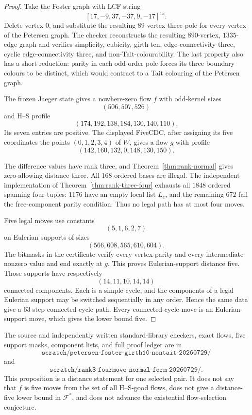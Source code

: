 \documentclass[11pt]{article}
\theoremstyle{definition}
\theoremstyle{remark}
\numberwithin{equation}{section}
\begin{document}
\begin{proof}
Take the Foster graph with LCF string
\[
                 [17,-9,37,-37,9,-17]^{15}.
\]
Delete vertex \(0\), and substitute the resulting \(89\)-vertex
three-pole for every vertex of the Petersen graph.  The checker
reconstructs the resulting \(890\)-vertex, \(1335\)-edge graph and
verifies simplicity, cubicity, girth ten, edge-connectivity three,
cyclic edge-connectivity three, and non-Tait-colourability.  The last
property also has a short reduction: parity in each odd-order pole
forces its three boundary colours to be distinct, which would contract
to a Tait colouring of the Petersen graph.

The frozen Jaeger state gives a nowhere-zero flow \(f\) with odd-kernel
sizes
\[
                         (506,507,526)
\]
and H--S profile
\[
                 (174,192,138,184,130,140,110).
\]
Its seven entries are positive.  The displayed FiveCDC, after assigning
its five coordinates the points \((0,1,2,3,4)\) of \(W\), gives a flow
\(g\) with profile
\[
                 (142,160,132,0,148,130,150).
\]

The difference values have rank three, and
Theorem~\ref{thm:rank-normal} gives zero-allowing distance three.
All \(168\) ordered bases are illegal.  The independent implementation
of Theorem~\ref{thm:rank-three-four} exhausts all \(1848\) ordered
spanning four-tuples: \(1176\) have an empty local list \(L_e\), and
the remaining \(672\) fail the free-component parity condition.
Thus no legal path has at most four moves.

Five legal moves use constants
\[
                         (5,1,6,2,7)
\]
on Eulerian supports of sizes
\[
                         (566,608,565,610,604).
\]
The bitmasks in the certificate verify every vertex parity and every
intermediate nonzero value and end exactly at \(g\).  This proves
Eulerian-support distance five.  Those supports have respectively
\[
                         (14,11,10,14,14)
\]
connected components.  Each is a simple cycle, and the components of a
legal Eulerian support may be switched sequentially in any order.
Hence the same data give a 63-step connected-cycle path.  Every
connected-cycle move is an Eulerian-support move, which gives the lower
bound five.
\end{proof}

The source and independently written standard-library checkers, exact
flows, five support masks, component lists, and full proof ledger are in
\[
\texttt{scratch/petersen-foster-girth10-nontait-20260729/}
\]
and
\[
\texttt{scratch/rank3-fourmove-normal-form-20260729/}.
\]
This proposition is a distance statement for one selected pair.  It
does not say that \(f\) is five moves from the set of all H--S-good
flows, does not give a distance-five lower bound in \(\mathcal F^*\),
and does not advance the existential flow-selection conjecture.
\end{document}
